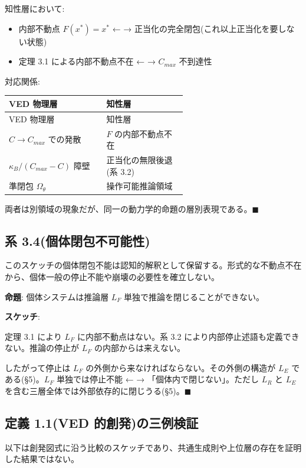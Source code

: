 知性層において:
\begin{itemize}
\item 内部不動点 $F(x^*) = x^*$ ← → 正当化の完全閉包(これ以上正当化を要しない状態)
\item 定理 3.1 による内部不動点不在 ← → $C_{max}$ 不到達性
\end{itemize}


対応関係:

\begin{longtable}{@{}p{0.30\linewidth}p{0.30\linewidth}@{}}
\toprule
VED 物理層 & 知性層 \\
\midrule
\endfirsthead
\toprule
VED 物理層 & 知性層 \\
\midrule
\endhead
$C \to C_{max}$ での発散 & $F$ の内部不動点不在 \\
$\kappa_B/(C_{max}-C)$ 障壁 & 正当化の無限後退(系 3.2) \\
準閉包 $\Omega_\theta$ & 操作可能推論領域 \\
\bottomrule
\end{longtable}


両者は別領域の現象だが、同一の動力学的命題の層別表現である。$\blacksquare$

\bigskip


\subsection{系 3.4(個体閉包不可能性)}

このスケッチの個体閉包不能は認知的解釈として保留する。形式的な不動点不在から、個体一般の停止不能や崩壊の必要性を確立しない。


\textbf{命題}: 個体システムは推論層 $L_F$ 単独で推論を閉じることができない。

\textbf{スケッチ}:

定理 3.1 により $L_F$ に内部不動点はない。系 3.2 により内部停止述語も定義できない。推論の停止が $L_F$ の内部からは来えない。

したがって停止は $L_F$ の外側から来なければならない。その外側の構造が $L_E$ である(\S{}5)。$L_F$ 単独では停止不能 ← → 「個体内で閉じない」。ただし $L_R$ と $L_E$ を含む三層全体では外部依存的に閉じうる(\S{}5)。$\blacksquare$

\bigskip


\subsection{定義 1.1(VED 的創発)の三例検証}

以下は創発図式に沿う比較のスケッチであり、共通生成則や上位層の存在を証明した結果ではない。


